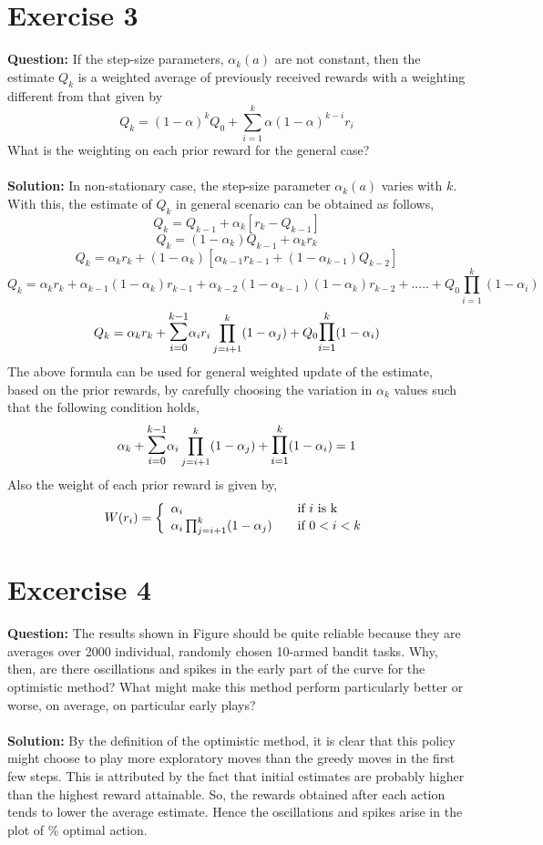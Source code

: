 \documentclass[a4paper,10pt]{report}
\begin{document}
\section{Exercise 3}
\textbf{Question:}
If the step-size parameters, $\alpha_{k}(a)$ are not constant, then the estimate $Q_k$ is a weighted average of previously 
received rewards with a weighting different from that given by  
\[Q_k = (1-\alpha)^kQ_0 + \sum_{i=1}^{k} \alpha(1-\alpha)^{k-i}r_i\]
What is the weighting on each prior reward for the general case?
\\\\
\textbf{Solution:}
In non-stationary case, the step-size parameter $\alpha_{k}(a)$ varies with $k$. With this, the estimate of $Q_k$ in general scenario can be obtained as follows,
\[Q_k = Q_{k-1} + \alpha_k[r_k - Q_{k-1}] \]
\[Q_k = (1-\alpha_k)Q_{k-1} + \alpha_kr_k\]
\[Q_k = \alpha_kr_k + (1-\alpha_k)[\alpha_{k-1}r_{k-1} + (1-\alpha_{k-1})Q_{k-2}]\]
\[Q_k = \alpha_kr_k + \alpha_{k-1}(1-\alpha_k)r_{k-1} + \alpha_{k-2}(1-\alpha_{k-1})(1-\alpha_{k})r_{k-2} + ..... + Q_0\prod_{i=1}^k (1-\alpha_i) \]
\[Q_k = \alpha_kr_k + \mathlarger{\mathlarger{\sum}}_{i=0}^{k-1} \alpha_{i}r_{i} \prod_{j=i+1}^{k} (1-\alpha_{j}) + Q_0\mathlarger{\mathlarger{\prod}}_{i=1}^k (1-\alpha_i)\]
The above formula can be used for general weighted update of the estimate, based on the prior rewards, by carefully choosing the variation in $\alpha_k$ values such that the following condition holds,
\[\alpha_k + \mathlarger{\mathlarger{\sum}}_{i=0}^{k-1} \alpha_{i} \prod_{j=i+1}^{k}(1-\alpha_{j}) + \mathlarger{\mathlarger{\prod}}_{i=1}^k (1-\alpha_i) = 1\]
Also the weight of each prior reward is given by,
\[ W(r_i) = \left\{ 
	\begin{array}{l l}
    		\alpha_i & \quad \text{if $i$ is k}\\
		\alpha_i \prod_{j=i+1}^{k} (1-\alpha_{j}) & \quad \text{if $0<i<k$}
	\end{array} \right.
\]
\section{Excercise 4}
\textbf{Question:}
The results shown in Figure should be quite reliable because they are averages over 2000 individual, randomly chosen 10-armed bandit tasks. Why, then, are there oscillations and spikes in the early part of the curve for the optimistic method? What might make this method perform particularly better or worse, on average, on particular early plays?
\\\\
\textbf{Solution:} By the definition of the optimistic method, it is clear that this policy might choose to play more exploratory moves than the greedy moves in the first few steps. This is attributed by the fact that initial estimates are probably higher than the highest reward attainable. So, the rewards obtained after each action tends to lower the average estimate. Hence the oscillations and spikes arise in the plot of \% optimal action. 
\end{document}
